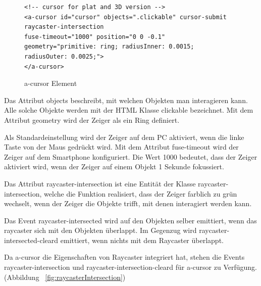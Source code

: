  \begin{figure}[ht]
\vspace*{1em}
\centering
\caption[a-cursor Element]{a-cursor Element}
\begin{lstlisting}[language=HTML5, style=htmlcssjs]
<!-- cursor for plat and 3D version -->
<a-cursor id="cursor" objects=".clickable" cursor-submit raycaster-intersection 
fuse-timeout="1000" position="0 0 -0.1" geometry="primitive: ring; radiusInner: 0.0015; radiusOuter: 0.0025;">
</a-cursor>
\end{lstlisting}
\label{fig:aCursorElement} 
\end{figure}
  
  Das Attribut {\selectfont objects} beschreibt, mit welchen Objekten man interagieren kann. Alle solche Objekte werden mit der HTML Klasse {\selectfont clickable} bezeichnet. Mit dem Attribut {\selectfont geometry} wird der Zeiger als ein Ring definiert.
  
  Als Standardeinstellung wird der Zeiger auf dem PC aktiviert, wenn die linke Taste von der Maus gedrückt wird. Mit dem Attribut {\selectfont fuse-timeout} wird der Zeiger auf dem Smartphone konfiguriert. Die Wert 1000 bedeutet, dass der Zeiger aktiviert wird, wenn der Zeiger auf einem Objekt 1 Sekunde fokussiert.
  
  Das Attribut {\selectfont raycaster-intersection} ist eine Entität der Klasse {\selectfont raycaster-intersection}, welche die Funktion realisiert, dass der Zeiger farblich zu grün wechselt, wenn der Zeiger die Objekte trifft, mit denen interagiert werden kann.
  
  Das Event {\selectfont raycaster-intersected} wird auf den Objekten selber emittiert, wenn das raycaster sich mit den Objekten überlappt. Im Gegenzug wird {\selectfont raycaster-intersected-cleard} emittiert, wenn nichts mit dem Raycaster überlappt.
  
  Da {\selectfont a-cursor} die Eigenschaften von Raycaster integriert hat, stehen die Events {\selectfont raycaster-intersection} und {\selectfont raycaster-intersection-cleard} für {\selectfont a-cursor} zu Verfügung. (Abbildung ~\ref{fig:raycasterIntersection})
  
